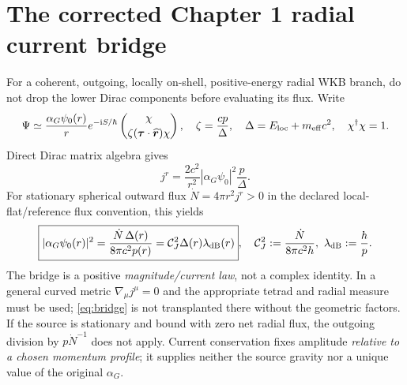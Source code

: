 \documentclass[11pt,a4paper,oneside]{report}
\numberwithin{equation}{chapter}
\theoremstyle{definition}\newtheorem{definition}[theorem]{Definition}
\theoremstyle{remark}\newtheorem{remark}[theorem]{Remark}
\newcommand{\ii}{\mathrm i}
\begin{document}
\section{The corrected Chapter 1 radial current bridge}\label{sec:bridge}
For a coherent, outgoing, locally on-shell, positive-energy radial WKB branch, do not drop the lower Dirac components before evaluating its flux. Write
\begin{equation}
 \Psi\simeq\frac{\alpha_G\psi_0(r)}{r}e^{-\ii S/\hbar}
 \begin{pmatrix}\chi\\[2pt]\zeta(\bm\tau\cdot\widehat{\bm r})\chi\end{pmatrix},
 \quad \zeta=\frac{cp}{\Delta},\quad
 \Delta=E_{\rm loc}+m_{\rm eff}c^2,\quad\chi^\dagger\chi=1.
 \label{eq:WKB}
\end{equation}
Direct Dirac matrix algebra gives
\begin{equation}
 j^r=\frac{2c^2}{r^2}|\alpha_G\psi_0|^2\frac{p}{\Delta}.
 \label{eq:current}
\end{equation}
For stationary spherical outward flux $\dot N=4\pi r^2j^r>0$ in the declared local-flat/reference flux convention, this yields
\begin{equation}
 \boxed{\displaystyle
 |\alpha_G\psi_0(r)|^2=\frac{\dot N\,\Delta(r)}{8\pi c^2p(r)}
 =\mathcal C_J^2\Delta(r)\lambda_{\rm dB}(r)},
 \quad\mathcal C_J^2:=\frac{\dot N}{8\pi c^2h},\ \lambda_{\rm dB}:=\frac hp.
 \label{eq:bridge}
\end{equation}
The bridge is a positive \emph{magnitude/current law}, not a complex identity. In a general curved metric $\nabla_\mu j^\mu=0$ and the appropriate tetrad and radial measure must be used; \eqref{eq:bridge} is not transplanted there without the geometric factors. If the source is stationary and bound with zero net radial flux, the outgoing division by $p\dot N^{-1}$ does not apply. Current conservation fixes amplitude \emph{relative to a chosen momentum profile}; it supplies neither the source gravity nor a unique value of the original $\alpha_G$.
\end{document}
